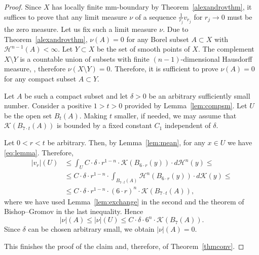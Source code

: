 \documentclass[12pt,leqno,intlimits]{amsart}
\numberwithin{equation}{section}
\theoremstyle{definition}
\theoremstyle{remark}
\newcommand{\tref}[1]{Theorem~\ref{#1}}
\newcommand{\lref}[1]{Lemma~\ref{#1}}
\begin{document}
\begin{proof}
Since $X$ has locally finite mm-boundary by
\tref{alexandrovthm}, it suffices to prove that any limit measure $\nu$ of a sequence $\frac 1 {r_j} v_{r_j}$ for $r_j\to 0$ must be the zero measure.
Let us fix such a limit measure $\nu$. Due to \tref{alexandrovthm}, $\nu (A)=0$ for any Borel subset $A\subset X$ with $\mathcal H^{n-1} (A)<\infty$.
Let $Y\subset X$ be the set of smooth points of $X$.
The complement $X\setminus Y$ is a countable union of subsets with finite $(n-1)$-dimensional Hausdorff measure, \cite[Theorem 1.4]{Schneider}, therefore $\nu (X\setminus Y) =0$. Therefore, it is sufficient to prove $\nu (A)=0$
for any compact subset $A\subset Y$.

Let $A$ be such a compact subset and let $\delta>0$ be an arbitrary sufficiently small number. Consider a positive $1>t>0$ provided by \lref{lem:compsm}. Let $U$ be the open set $B_t (A)$. Making $t$ smaller, if needed, we may assume that $\mathcal K(B_{7{\cdot}t}(A))$ is bounded by a
fixed constant $C_1$ independent of $\delta$.

Let $0<r<t$ be arbitrary. Then, by \lref{lem:mean}, for any $x\in U$ we have \eqref{eq:lemma}.
Therefore, 
\begin{align*}
|v_r| (U)
&\leq \int _U C\cdot \delta \cdot r^{1-n}\cdot \mathcal K (B_{6{\cdot}r} (y)) \cdot d\mathcal H^n (y) \leq
\\
&\leq C\cdot \delta \cdot r^{1-n} \cdot \int _{B_{7{\cdot}t} (A)} \mathcal H^n (B_{6{\cdot}r} (y)) \cdot d\mathcal K(y) 
\leq 
\\
&\leq C\cdot \delta \cdot r^{1-n} \cdot (6{\cdot}r) ^n \cdot \mathcal K(B_{7{\cdot}t} (A)),
\end{align*}
where we have used \lref{lem:exchange} in the second and the theorem of Bishop--Gromov in the last inequality. Hence
$$|\nu| (A) \leq |\nu| (U) \leq C\cdot \delta \cdot 6^n \cdot \mathcal K(B_7 (A)). $$
Since $\delta$ can be chosen arbitrary small, we obtain $|\nu| (A)=0$.

This finishes the proof of the claim and, therefore, of \tref{thmconv}.
\end{proof}

\end{document}
